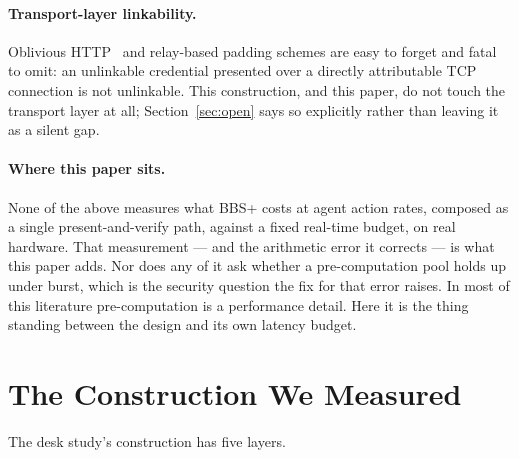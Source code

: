 \documentclass[11pt]{article}
\begin{document}
\paragraph{Transport-layer linkability.} Oblivious HTTP~\cite{ohttp} and
relay-based padding schemes are easy to forget and fatal to omit: an
unlinkable credential presented over a directly attributable TCP connection
is not unlinkable. This construction, and this paper, do not touch the
transport layer at all; Section~\ref{sec:open} says so explicitly rather
than leaving it as a silent gap.

\paragraph{Where this paper sits.} None of the above measures what BBS+
costs at agent action rates, composed as a single present-and-verify path,
against a fixed real-time budget, on real hardware. That measurement --- and
the arithmetic error it corrects --- is what this paper adds. Nor does any of
it ask whether a pre-computation pool holds up under burst, which is the
security question the fix for that error raises. In most of this literature
pre-computation is a performance detail. Here it is the thing standing
between the design and its own latency budget.

\section{The Construction We Measured}
\label{sec:construction}

The desk study's construction has five layers.
\end{document}
